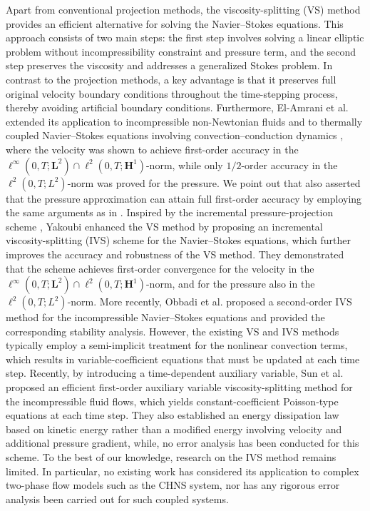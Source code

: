 Apart from conventional projection methods, the viscosity-splitting (VS) method \cite{blasco1998fractional} provides an efficient alternative for solving the Navier--Stokes equations. This approach consists of two main steps: the first step involves solving a linear elliptic problem without incompressibility constraint and pressure term, and the second step preserves the viscosity and addresses a generalized Stokes problem. In contrast to the projection methods, a key advantage is that it preserves full original velocity boundary conditions throughout the time-stepping process, thereby avoiding artificial boundary conditions. Furthermore, El-Amrani et al. extended its application to incompressible non-Newtonian fluids \cite{el2024error} and to thermally coupled Navier–Stokes equations involving convection–conduction dynamics \cite{el2024time}, where the velocity was shown to achieve first-order accuracy in the $\ell^\infty(0,T; \bm L^2) \cap \ell^2(0,T; \bm H^1)$-norm, while only $1/2$-order accuracy in the $\ell^2(0,T;  L^2)$-norm was proved for the pressure. We point out that \cite{el2024error} also asserted that the pressure approximation can attain full first-order accuracy by employing the same arguments as in \cite{guillen2011new,yakoubi2023enhancing}.  
Inspired by the incremental pressure-projection scheme \cite{goda1979multistep}, Yakoubi \cite{yakoubi2023enhancing} enhanced the VS method by proposing an incremental viscosity-splitting (IVS) scheme for the Navier–Stokes equations, which further improves the accuracy and robustness of the VS method. They demonstrated that the scheme achieves first-order convergence for the velocity in the $\ell^\infty(0,T; \bm L^2) \cap \ell^2(0,T; \bm H^1)$-norm, and for the pressure also in the $\ell^2(0,T;  L^2)$-norm.  More recently, Obbadi et al. \cite{obbadi2025stable} proposed a second-order IVS method for the incompressible Navier–Stokes equations and provided the corresponding stability analysis.   However, the existing VS and IVS methods typically employ a semi-implicit treatment for the nonlinear convection terms, which results in variable-coefficient equations that must be updated at each time step. Recently, by introducing a time-dependent auxiliary variable, Sun et al. \cite{Yang2024error} proposed an efficient first-order auxiliary variable viscosity-splitting method for the incompressible fluid flows, which yields constant-coefficient Poisson-type equations at each time step. They also established an energy dissipation law based on kinetic energy rather than a modified energy involving velocity and additional pressure gradient, while, no error analysis has been conducted for this scheme.  
To the best of our knowledge, research on the IVS method remains limited. In particular, no existing work has considered its application to complex two-phase flow models such as the CHNS system, nor has any rigorous error analysis been carried out for such coupled systems.

